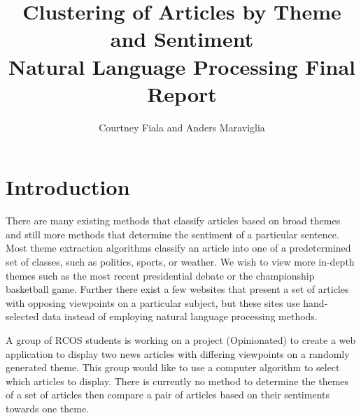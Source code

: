 \documentclass[12pt]{article}
\begin{document}
\title{Clustering of Articles by Theme and Sentiment \\ {\Large Natural Language Processing Final Report}}
\author{Courtney Fiala and Anders Maraviglia}

\maketitle


\section{Introduction}
There are many existing methods that classify articles based on broad themes and still more methods that determine the sentiment of a particular sentence. Most theme extraction algorithms classify an article into one of a predetermined set of classes, such as politics, sports, or weather. We wish to view more in-depth themes such as the most recent presidential debate or the championship basketball game. Further there exist a few websites that present a set of articles with opposing viewpoints on a particular subject, but these sites use hand-selected data instead of employing natural language processing methods.

A group of RCOS students is working on a project (Opinionated) to create a web application to display two news articles with differing viewpoints on a randomly generated theme. This group would like to use a computer algorithm to select which articles to display. There is currently no method to determine the themes of a set of articles then compare a pair of articles based on their sentiments towards one theme.
\end{document}

